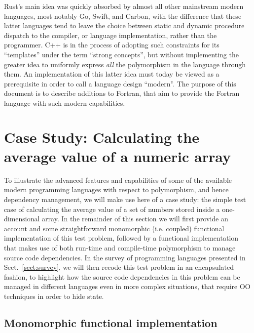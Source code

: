 \documentclass[11pt,oneside]{article}
\begin{document}
Rust's main idea was quickly absorbed by almost all other mainstream
modern languages, most notably Go, Swift, and Carbon, with the
difference that these latter languages tend to leave the choice
between static and dynamic procedure dispatch to the compiler, or
language implementation, rather than the programmer. C++ is in the
process of adopting such constraints for its ``templates'' under the
term ``strong concepts'', but without implementing the greater idea to
uniformly express \emph{all} the polymorphism in the language through
them. An implementation of this latter idea must today be viewed as a
prerequisite in order to call a language design ``modern''. The
purpose of this document is to describe additions to Fortran, that aim
to provide the Fortran language with such modern capabilities.

\newpage

\section{Case Study: Calculating the average value of a numeric array}

To illustrate the advanced features and capabilities of some of the
available modern programming languages with respect to polymorphism,
and hence dependency management, we will make use here of a case
study: the simple test case of calculating the average value of a set
of numbers stored inside a one-dimensional array. In the remainder of
this section we will first provide an account and some straightforward
monomorphic (i.e. coupled) functional implementation of this test
problem, followed by a functional implementation that makes use of
both run-time and compile-time polymorphism to manage source code
dependencies. In the survey of programming languages presented in
Sect.~\ref{sect:survey}, we will then recode this test problem in an
encapsulated fashion, to highlight how the source code dependencies in
this problem can be managed in different languages even in more
complex situations, that require OO techniques in order to hide state.

\subsection{Monomorphic functional implementation}
\end{document}
